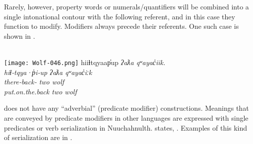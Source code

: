 \noindent Rarely, however, property words or numerals/quantifiers will be combined into a single intonational contour with the following referent, and in this case they function to modify. Modifiers always precede their referents. One such case is shown in .

\begin{exe}
  \ex\label{ex:3.16}
  \\
  \texttt{[image: Wolf-046.png]}
  \gllll hiiɬtqyaap̓up            \em{ʔaƛa} qʷayac̓iik.\\
         hiɬ‑tqya·p̓i‑up          \em{ʔaƛa} qʷayac̓iːk\\
         there‑back‑ \em{two}  wolf\\
         put.on.the.back         \em{two}  wolf\\
         \vfix
\end{exe}

 does not have any \enquote{adverbial} (predicate modifier) constructions. Meanings that are conveyed by predicate modifiers in other languages are expressed with single predicates or verb serialization in Nuuchahnulth. \citeauthor{Nakayama2001} states, . Examples of this kind of serialization are in .


